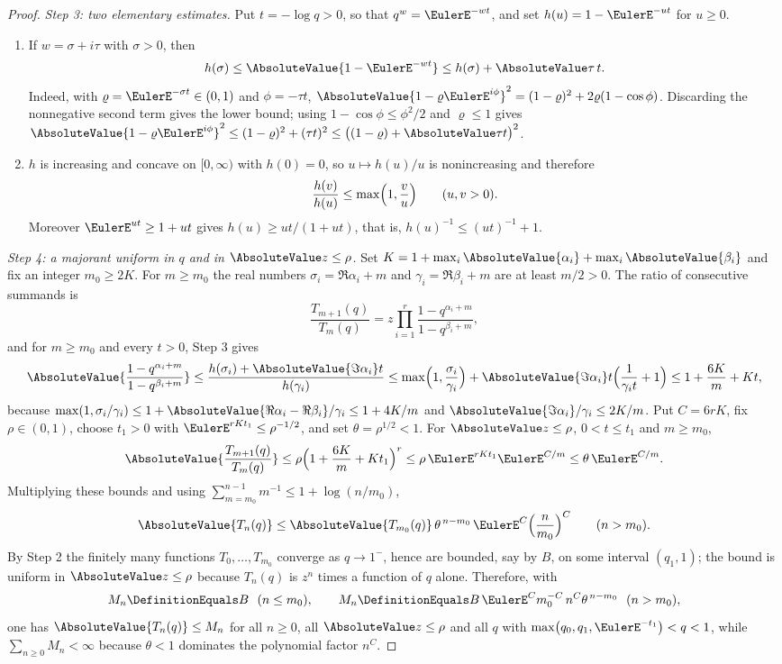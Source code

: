 \documentclass[11pt,a4paper,oneside,openany]{book}
\theoremstyle{definition}
\theoremstyle{remark}
\begin{document}
\begin{proof}
\emph{Step 3: two elementary estimates.}
Put $t=-\log q>0$, so that $q^{w}=\EulerE^{-wt}$, and set $h(u)=1-\EulerE^{-ut}$ for $u\ge0$.
\begin{enumerate}[label=\textup{(\alph*)}]
\item If $w=\sigma+i\tau$ with $\sigma>0$, then
\[
 h(\sigma)\le\AbsoluteValue{1-\EulerE^{-wt}}\le h(\sigma)+\AbsoluteValue\tau\,t .
\]
Indeed, with $\varrho=\EulerE^{-\sigma t}\in(0,1)$ and $\phi=-\tau t$,
$\AbsoluteValue{1-\varrho \EulerE^{i\phi}}^2=(1-\varrho)^2+2\varrho(1-\cos\phi)$.  Discarding the nonnegative second term gives the lower bound; using $1-\cos\phi\le\phi^2/2$ and $\varrho\le1$ gives $\AbsoluteValue{1-\varrho \EulerE^{i\phi}}^2\le(1-\varrho)^2+(\tau t)^2\le\bigl((1-\varrho)+\AbsoluteValue\tau t\bigr)^2$.
\item $h$ is increasing and concave on $[0,\infty)$ with $h(0)=0$, so $u\mapsto h(u)/u$ is nonincreasing and therefore
\[
 \frac{h(v)}{h(u)}\le\max\Bigl(1,\frac vu\Bigr)\qquad(u,v>0).
\]
Moreover $\EulerE^{ut}\ge1+ut$ gives $h(u)\ge ut/(1+ut)$, that is, $h(u)^{-1}\le(ut)^{-1}+1$.
\end{enumerate}

\emph{Step 4: a majorant uniform in $q$ and in $\AbsoluteValue z\le\rho$.}
Set $K=1+\max_{i}\AbsoluteValue{\alpha_i}+\max_{i}\AbsoluteValue{\beta_i}$ and fix an integer $m_0\ge2K$.  For $m\ge m_0$ the real numbers $\sigma_i=\Re\alpha_i+m$ and $\gamma_i=\Re\beta_i+m$ are at least $m/2>0$.  The ratio of consecutive summands is
\[
 \frac{T_{m+1}(q)}{T_m(q)}
 =z\prod_{i=1}^{r}\frac{1-q^{\alpha_i+m}}{1-q^{\beta_i+m}},
\]
and for $m\ge m_0$ and every $t>0$, Step 3 gives
\[
 \AbsoluteValue{\frac{1-q^{\alpha_i+m}}{1-q^{\beta_i+m}}}
 \le\frac{h(\sigma_i)+\AbsoluteValue{\Im\alpha_i}t}{h(\gamma_i)}
 \le\max\Bigl(1,\frac{\sigma_i}{\gamma_i}\Bigr)
  +\AbsoluteValue{\Im\alpha_i}t\Bigl(\frac1{\gamma_it}+1\Bigr)
 \le1+\frac{6K}m+Kt,
\]
because $\max(1,\sigma_i/\gamma_i)\le1+\AbsoluteValue{\Re\alpha_i-\Re\beta_i}/\gamma_i\le1+4K/m$ and $\AbsoluteValue{\Im\alpha_i}/\gamma_i\le2K/m$.  Put $C=6rK$, fix $\rho\in(0,1)$, choose $t_1>0$ with $\EulerE^{rKt_1}\le\rho^{-1/2}$, and set $\theta=\rho^{1/2}<1$.  For $\AbsoluteValue z\le\rho$, $0<t\le t_1$ and $m\ge m_0$,
\[
 \AbsoluteValue{\frac{T_{m+1}(q)}{T_m(q)}}
 \le\rho\Bigl(1+\frac{6K}m+Kt_1\Bigr)^{r}
 \le\rho\,\EulerE^{rKt_1}\EulerE^{C/m}
 \le\theta\,\EulerE^{C/m}.
\]
Multiplying these bounds and using $\sum_{m=m_0}^{n-1}m^{-1}\le1+\log(n/m_0)$,
\[
 \AbsoluteValue{T_n(q)}\le\AbsoluteValue{T_{m_0}(q)}\,\theta^{\,n-m_0}\,\EulerE^{C}\Bigl(\frac n{m_0}\Bigr)^{C}
 \qquad(n>m_0).
\]
By Step 2 the finitely many functions $T_0,\dots,T_{m_0}$ converge as $q\to1^-$, hence are bounded, say by $B$, on some interval $(q_1,1)$; the bound is uniform in $\AbsoluteValue z\le\rho$ because $T_n(q)$ is $z^n$ times a function of $q$ alone.  Therefore, with
\[
 M_n\DefinitionEquals B\ \ (n\le m_0),
 \qquad
 M_n\DefinitionEquals B\,\EulerE^{C}m_0^{-C}\,n^{C}\theta^{\,n-m_0}\ \ (n>m_0),
\]
one has $\AbsoluteValue{T_n(q)}\le M_n$ for all $n\ge0$, all $\AbsoluteValue z\le\rho$ and all $q$ with $\max\bigl(q_0,q_1,\EulerE^{-t_1}\bigr)<q<1$, while $\sum_{n\ge0}M_n<\infty$ because $\theta<1$ dominates the polynomial factor $n^{C}$.


\end{proof}
\end{document}
